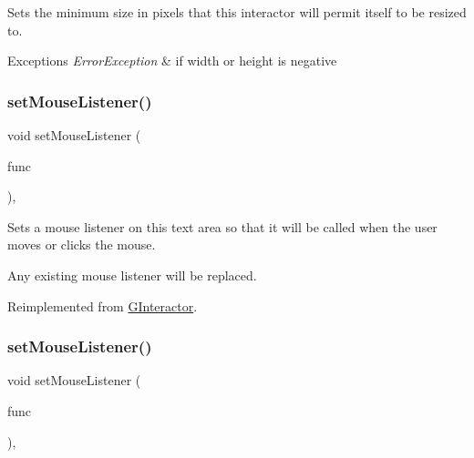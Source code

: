 Sets the minimum size in pixels that this interactor will permit itself to be resized to. 


\begin{DoxyExceptions}{Exceptions}
{\em Error\+Exception} & if width or height is negative \\
\hline
\end{DoxyExceptions}
\mbox{\label{classsgl_1_1GTextArea_a2c6a3746da7ffa3819294896d4423059}} 
\subsubsection{\texorpdfstring{set\+Mouse\+Listener()}{setMouseListener()}\hspace{0.1cm}{\footnotesize\ttfamily [1/2]}}
{\footnotesize\ttfamily void set\+Mouse\+Listener (\begin{DoxyParamCaption}\item[{\mbox{\hyperlink{namespacesgl_ae9f3e9eab70035da1a2b114e21357b25}{G\+Event\+Listener}}}]{func }\end{DoxyParamCaption})\hspace{0.3cm}{\ttfamily [override]}, {\ttfamily [virtual]}}



Sets a mouse listener on this text area so that it will be called when the user moves or clicks the mouse. 

Any existing mouse listener will be replaced. 

Reimplemented from \mbox{\hyperlink{classsgl_1_1GInteractor_a37d8dbc943f59920f705b0104f60bde2}{G\+Interactor}}.

\mbox{\label{classsgl_1_1GTextArea_a3ed42c5f929cba378927916dd73e6576}} 
\subsubsection{\texorpdfstring{set\+Mouse\+Listener()}{setMouseListener()}\hspace{0.1cm}{\footnotesize\ttfamily [2/2]}}
{\footnotesize\ttfamily void set\+Mouse\+Listener (\begin{DoxyParamCaption}\item[{\mbox{\hyperlink{namespacesgl_a54427ce97bb1c2804e4fe2b0a62e8b17}{G\+Event\+Listener\+Void}}}]{func }\end{DoxyParamCaption})\hspace{0.3cm}{\ttfamily [override]}, {\ttfamily [virtual]}}




